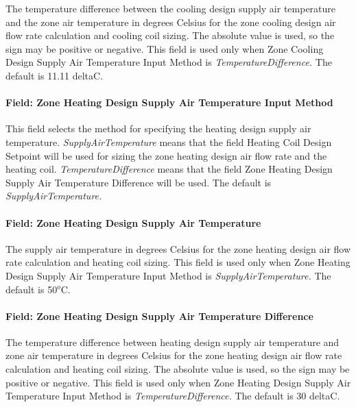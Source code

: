 The temperature difference between the cooling design supply air temperature and the zone air temperature in degrees Celsius for the zone cooling design air flow rate calculation and cooling coil sizing. The absolute value is used, so the sign may be positive or negative. This field is used only when Zone Cooling Design Supply Air Temperature Input Method is \emph{TemperatureDifference.} The default is 11.11 deltaC.

\paragraph{Field: Zone Heating Design Supply Air Temperature Input Method}\label{field-zone-heating-design-supply-air-temperature-input-method-1}

This field selects the method for specifying the heating design supply air temperature. \emph{SupplyAirTemperature} means that the field Heating Coil Design Setpoint will be used for sizing the zone heating design air flow rate and the heating coil. \emph{TemperatureDifference} means that the field Zone Heating Design Supply Air Temperature Difference will be used. The default is \emph{SupplyAirTemperature.}

\paragraph{Field: Zone Heating Design Supply Air Temperature}\label{field-zone-heating-design-supply-air-temperature-000}

The supply air temperature in degrees Celsius for the zone heating design air flow rate calculation and heating coil sizing. This field is used only when Zone Heating Design Supply Air Temperature Input Method is \emph{SupplyAirTemperature.} The default is 50\(^{o}\)C.

\paragraph{Field: Zone Heating Design Supply Air Temperature Difference}\label{field-zone-heating-design-supply-air-temperature-difference-1}

The temperature difference between heating design supply air temperature and zone air temperature in degrees Celsius for the zone heating design air flow rate calculation and heating coil sizing. The absolute value is used, so the sign may be positive or negative. This field is used only when Zone Heating Design Supply Air Temperature Input Method is \emph{TemperatureDifference.} The default is 30 deltaC.

